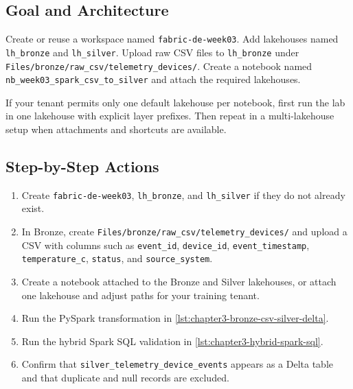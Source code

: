\subsection{Goal and Architecture}
Create or reuse a workspace named \texttt{fabric-de-week03}. Add lakehouses named \texttt{lh\_bronze} and \texttt{lh\_silver}. Upload raw CSV files to \texttt{lh\_bronze} under \texttt{Files/bronze/raw\_csv/telemetry\_devices/}. Create a notebook named \texttt{nb\_week03\_spark\_csv\_to\_silver} and attach the required lakehouses.

\begin{notebox}
If your tenant permits only one default lakehouse per notebook, first run the lab in one lakehouse with explicit layer prefixes. Then repeat in a multi-lakehouse setup when attachments and shortcuts are available.
\end{notebox}

\subsection{Step-by-Step Actions}
\begin{enumerate}
    \item Create \texttt{fabric-de-week03}, \texttt{lh\_bronze}, and \texttt{lh\_silver} if they do not already exist.
    \item In Bronze, create \texttt{Files/bronze/raw\_csv/telemetry\_devices/} and upload a CSV with columns such as \texttt{event\_id}, \texttt{device\_id}, \texttt{event\_timestamp}, \texttt{temperature\_c}, \texttt{status}, and \texttt{source\_system}.
    \item Create a notebook attached to the Bronze and Silver lakehouses, or attach one lakehouse and adjust paths for your training tenant.
    \item Run the PySpark transformation in \cref{lst:chapter3-bronze-csv-silver-delta}.
    \item Run the hybrid Spark SQL validation in \cref{lst:chapter3-hybrid-spark-sql}.
    \item Confirm that \texttt{silver\_telemetry\_device\_events} appears as a Delta table and that duplicate and null records are excluded.
\end{enumerate}

